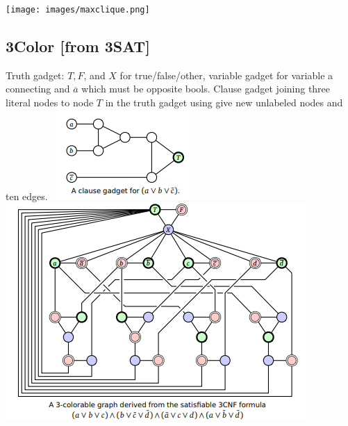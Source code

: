 \texttt{[image: images/maxclique.png]}

\subsection{3Color [from 3SAT]}

Truth gadget: $T,F$, and $X$ for true/false/other, variable gadget for variable a connecting and $\overbar{a}$ which must be opposite bools. Clause gadget joining three literal nodes to node $T$ in the truth gadget using give new unlabeled nodes and ten edges.
\includegraphics{images/3colorgadget.png}
\includegraphics[width=\linewidth]{images/3colorgraph.png}